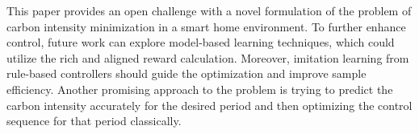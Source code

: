 This paper provides an open challenge with a novel formulation of the problem of carbon intensity minimization in a smart home environment. To further enhance control, future work can explore model-based learning techniques, which could utilize the rich and aligned reward calculation. Moreover, imitation learning from rule-based controllers should guide the optimization and improve sample efficiency. Another promising approach to the problem is trying to predict the carbon intensity accurately for the desired period and then optimizing the control sequence for that period classically.
